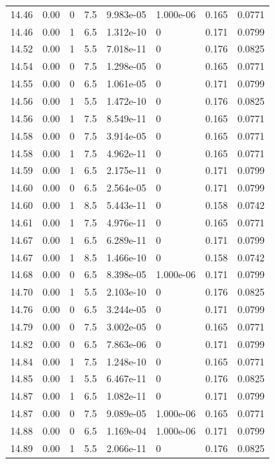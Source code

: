 \documentclass[preview]{standalone}
\begin{document}
{{{{{{{{{{{{{{{{{\begin{tabular}{L{1.2cm}C{1.2cm} C{0.3cm}C{0.5cm} C{1.4cm}C{1.4cm} C{1.4cm}C{1.4cm}}
  14.46  &  0.00  & 0     & 7.5 &  9.983e-05  & 1.000e-06  & 0.165 &  0.0771   \\ 
  14.46  &  0.00  & 1     & 6.5 &  1.312e-10  & 0  & 0.171 &  0.0799   \\ 
  14.52  &  0.00  & 1     & 5.5 &  7.018e-11  & 0  & 0.176 &  0.0825   \\ 
  14.54  &  0.00  & 0     & 7.5 &  1.298e-05  & 0  & 0.165 &  0.0771   \\ 
  14.55  &  0.00  & 0     & 6.5 &  1.061e-05  & 0  & 0.171 &  0.0799   \\ 
  14.56  &  0.00  & 1     & 5.5 &  1.472e-10  & 0  & 0.176 &  0.0825   \\ 
  14.56  &  0.00  & 1     & 7.5 &  8.549e-11  & 0  & 0.165 &  0.0771   \\ 
  14.58  &  0.00  & 0     & 7.5 &  3.914e-05  & 0  & 0.165 &  0.0771   \\ 
  14.58  &  0.00  & 1     & 7.5 &  4.962e-11  & 0  & 0.165 &  0.0771   \\ 
  14.59  &  0.00  & 1     & 6.5 &  2.175e-11  & 0  & 0.171 &  0.0799   \\ 
  14.60  &  0.00  & 0     & 6.5 &  2.564e-05  & 0  & 0.171 &  0.0799   \\ 
  14.60  &  0.00  & 1     & 8.5 &  5.443e-11  & 0  & 0.158 &  0.0742   \\ 
  14.61  &  0.00  & 1     & 7.5 &  4.976e-11  & 0  & 0.165 &  0.0771   \\ 
  14.67  &  0.00  & 1     & 6.5 &  6.289e-11  & 0  & 0.171 &  0.0799   \\ 
  14.67  &  0.00  & 1     & 8.5 &  1.466e-10  & 0  & 0.158 &  0.0742   \\ 
  14.68  &  0.00  & 0     & 6.5 &  8.398e-05  & 1.000e-06  & 0.171 &  0.0799   \\ 
  14.70  &  0.00  & 1     & 5.5 &  2.103e-10  & 0  & 0.176 &  0.0825   \\ 
  14.76  &  0.00  & 0     & 6.5 &  3.244e-05  & 0  & 0.171 &  0.0799   \\ 
  14.79  &  0.00  & 0     & 7.5 &  3.002e-05  & 0  & 0.165 &  0.0771   \\ 
  14.82  &  0.00  & 0     & 6.5 &  7.863e-06  & 0  & 0.171 &  0.0799   \\ 
  14.84  &  0.00  & 1     & 7.5 &  1.248e-10  & 0  & 0.165 &  0.0771   \\ 
  14.85  &  0.00  & 1     & 5.5 &  6.467e-11  & 0  & 0.176 &  0.0825   \\ 
  14.87  &  0.00  & 1     & 6.5 &  1.082e-11  & 0  & 0.171 &  0.0799   \\ 
  14.87  &  0.00  & 0     & 7.5 &  9.089e-05  & 1.000e-06  & 0.165 &  0.0771   \\ 
  14.88  &  0.00  & 0     & 6.5 &  1.169e-04  & 1.000e-06  & 0.171 &  0.0799   \\ 
  14.89  &  0.00  & 1     & 5.5 &  2.066e-11  & 0  & 0.176 &  0.0825   \\ 
\hline 
\end{tabular} 

}}}}}}}}}}}}}}}}}
\end{document}
